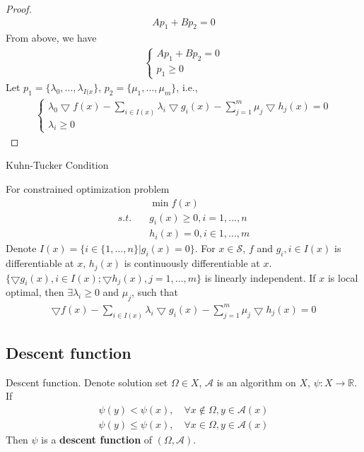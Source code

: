 \documentclass[runningheads]{llncs}
\begin{document}
\begin{proof}
\begin{align}
        Ap_1 + Bp_2 = 0
    \end{align}
    From above, we have
    \begin{align}
        \left\{
        \begin{array}{ll}
            Ap_1 + Bp_2 = 0 \\
            p_1 \geq 0
        \end{array}
        \right.
    \end{align}
    Let $p_1 = \{\lambda_0,..., \lambda_{I(x}\}$,
    $p_2 = \{\mu_1, ..., \mu_m\}$, i.e.,
    \begin{align}
        \left\{
            \begin{array}{ll}
            \lambda_0 \bigtriangledown f(x) - \sum_{i \in I(x)} \lambda_i
            \bigtriangledown g_i(x) - \sum_{j=1}^m \mu_j
            \bigtriangledown h_j(x) = 0 \\
            \lambda_i \geq 0
            \end{array}
            \right.
    \end{align}
\end{proof}

\begin{theorem}{Kuhn-Tucker Condition}
    \par
    For constrained optimization problem
    \begin{align}
        & \min f(x) \\
        s.t.\quad & g_i(x) \geq 0, i = 1,..., n \\
        & h_i(x) = 0, i \in 1, ..., m
    \end{align}
    Denote $I(x) = \{i \in \{1,...,n\} | g_i(x) = 0\}$.
    For $x \in \mathcal{S}$, $f$ and $g_i, i \in I(x)$
    is differentiable at $x$, $h_j(x)$ is continuously
    differentiable at $x$.
    $\{\bigtriangledown g_i(x), i \in I(x);\bigtriangledown h_j(x), 
    j = 1,...,m\}$ is linearly independent.
    If $x$ is local optimal, then $\exists \lambda_i \geq 0$
    and $\mu_j$, such that
    \begin{align}
        \bigtriangledown f(x) - \sum_{i \in I(x)} \lambda_i
        \bigtriangledown g_i(x) - \sum_{j=1}^m \mu_j
        \bigtriangledown h_j(x) = 0
    \end{align}
\end{theorem}
\subsection{Descent function}
\par
\begin{definition}{Descent function.}
    Denote solution set $\Omega \in X$, $\mathcal{A}$ is an
    algorithm on $X$, $\psi: X \rightarrow \mathbb{R}$.
    If
    \begin{align}
        \psi(y) < \psi(x),\quad \forall x \notin \Omega, y \in \mathcal{A}(x) \\
        \psi(y) \leq \psi(x),\quad \forall x \in \Omega, y \in \mathcal{A}(x)
    \end{align}
    Then $\psi$ is a \textbf{descent function} of $(\Omega, \mathcal{A})$.
\end{definition}
\end{document}
